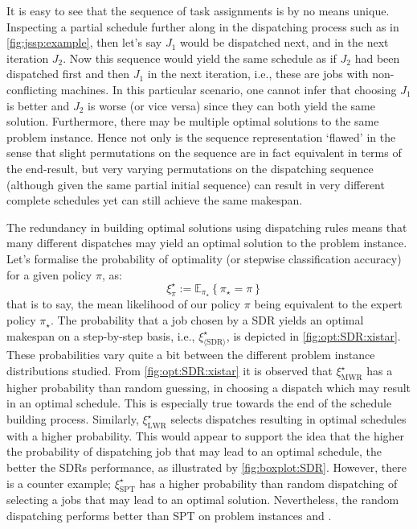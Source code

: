\documentclass[twocolumn]{svjour3}
\begin{document}
It is easy to see that the sequence of task assignments is by no means unique. 
Inspecting a partial schedule further along in the dispatching process such as 
in \cref{fig:jssp:example}, then let's say $J_1$ would be dispatched next, and 
in the next iteration $J_2$. Now this sequence would yield the same schedule as 
if $J_2$ had been dispatched first and then $J_1$ in the next iteration, 
i.e., these are jobs with non-conflicting machines. 
In this particular scenario, one cannot infer that choosing $J_1$ is better 
and $J_2$ is worse (or vice versa) since they can both yield the same solution.
Furthermore, 
there may be multiple optimal solutions to the same 
problem instance. Hence not only is the sequence representation `flawed' in the 
sense that slight permutations on the sequence are in fact equivalent in terms 
of the end-result, but very varying permutations on the dispatching sequence 
(although given the same partial initial sequence) can result in very different 
complete schedules yet can still achieve the same makespan. 

The redundancy in building optimal solutions using dispatching rules means that 
many different dispatches may yield an optimal solution to the problem instance.
Let's formalise the probability of optimality (or stepwise 
classification accuracy) for a given policy $\pi$, as:
\begin{equation}\quad \label{eq:tracc:opt}
\xi^\star_{\pi} := \mathbb{E}_{\pi_\star}\left\{\pi_{\star} = \pi \right\}
\end{equation}
that is to say, the mean likelihood of our policy $\pi$ being equivalent to the 
expert policy $\pi_\star$.
The probability that a job chosen by a SDR yields an optimal makespan on a 
step-by-step basis, i.e., $\xi^\star_{\langle \text{SDR} \rangle}$, is depicted 
in \cref{fig:opt:SDR:xistar}. These probabilities
vary quite a bit between the different problem instance distributions studied. 
From \cref{fig:opt:SDR:xistar} it is observed that $\xi^\star_{\text{MWR}}$ has 
a higher probability than random guessing, in choosing a dispatch which may 
result in an optimal schedule. This is especially true towards the end of the 
schedule building process. 
Similarly, $\xi^\star_{\text{LWR}}$ selects dispatches 
resulting in optimal schedules with a higher probability. This would appear to 
support the idea that the higher the probability of dispatching job that 
may lead to an optimal schedule, the better the SDRs performance, as 
illustrated by \cref{fig:boxplot:SDR}. However, there is a counter example; 
$\xi^\star_{\text{SPT}}$ has a higher probability than random dispatching of 
selecting a jobs that may lead to an optimal solution. Nevertheless, the random 
dispatching performs better than SPT on problem instances  and 
. 
\end{document}
